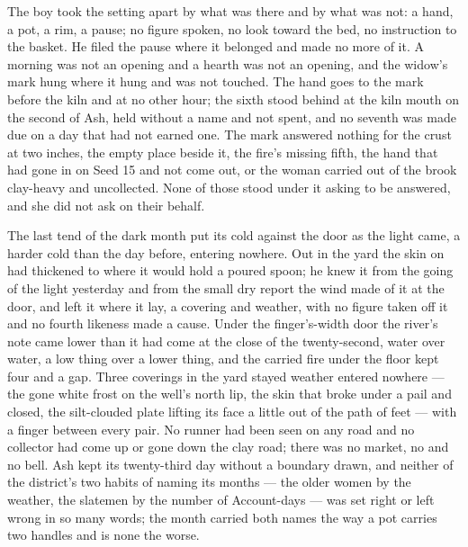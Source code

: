 The boy took the setting apart by what was there and by what was not: a hand, a pot, a rim, a pause; no figure spoken, no look toward the bed, no instruction to the basket. He filed the pause where it belonged and made no more of it. A morning was not an opening and a hearth was not an opening, and the widow's mark hung where it hung and was not touched. The hand goes to the mark before the kiln and at no other hour; the sixth stood behind at the kiln mouth on the second of Ash, held without a name and not spent, and no seventh was made due on a day that had not earned one. The mark answered nothing for the crust at two inches, the empty place beside it, the fire's missing fifth, the hand that had gone in on Seed 15 and not come out, or the woman carried out of the brook clay-heavy and uncollected. None of those stood under it asking to be answered, and she did not ask on their behalf.

The last tend of the dark month put its cold against the door as the light came, a harder cold than the day before, entering nowhere. Out in the yard the skin on  had thickened to where it would hold a poured spoon; he knew it from the going of the light yesterday and from the small dry report the wind made of it at the door, and left it where it lay, a covering and weather, with no figure taken off it and no fourth likeness made a cause. Under the finger's-width door the river's note came lower than it had come at the close of the twenty-second, water over water, a low thing over a lower thing, and the carried fire under the floor kept four and a gap. Three coverings in the yard stayed weather entered nowhere --- the gone white frost on the well's north lip, the skin that broke under a pail and closed, the silt-clouded plate lifting its face a little out of the path of feet --- with a finger between every pair. No runner had been seen on any road and no collector had come up or gone down the clay road; there was no market, no  and no bell. Ash kept its twenty-third day without a boundary drawn, and neither of the district's two habits of naming its months --- the older women by the weather, the slatemen by the number of Account-days --- was set right or left wrong in so many words; the month carried both names the way a pot carries two handles and is none the worse.

